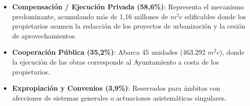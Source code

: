 \begin{table}[htbp]
  \centering
  \caption{Distribución de Unidades de Actuación según Sistema de Ejecución}
  \label{tab:resumen_sistemas}
  \vspace{0.2cm}
  
\end{table}

\begin{itemize}
  \item \textbf{Compensación / Ejecución Privada (58,6\%)}: Representa el mecanismo predominante, acumulando más de 1,16 millones de $m^2c$ edificables donde los propietarios asumen la redacción de los proyectos de urbanización y la cesión de aprovechamientos.
  \item \textbf{Cooperación Pública (35,2\%)}: Abarca 45 unidades (463.292 $m^2c$), donde la ejecución de las obras corresponde al Ayuntamiento a costa de los propietarios.
  \item \textbf{Expropiación y Convenios (3,9\%)}: Reservados para ámbitos con afecciones de sistemas generales o actuaciones asistemáticas singulares.
\end{itemize}
